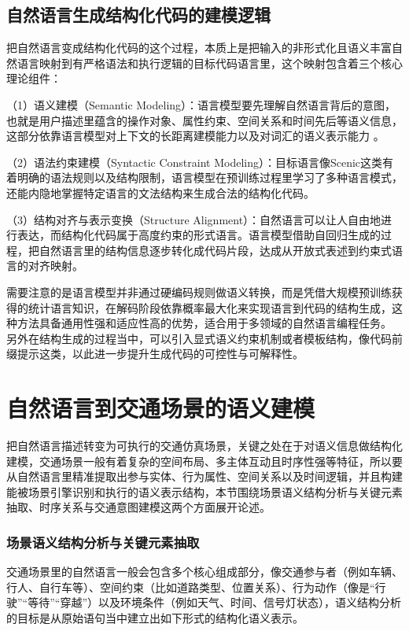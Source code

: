 \subsection{自然语言生成结构化代码的建模逻辑}

把自然语言变成结构化代码的这个过程，本质上是把输入的非形式化且语义丰富自然语言映射到有严格语法和执行逻辑的目标代码语言里，这个映射包含着三个核心理论组件：


	 （1）语义建模（Semantic Modeling）：语言模型要先理解自然语言背后的意图，也就是用户描述里蕴含的操作对象、属性约束、空间关系和时间先后等语义信息，这部分依靠语言模型对上下文的长距离建模能力以及对词汇的语义表示能力 。
	
	 （2）语法约束建模（Syntactic Constraint Modeling）：目标语言像Scenic这类有着明确的语法规则以及结构限制，语言模型在预训练过程里学习了多种语言模式，还能内隐地掌握特定语言的文法结构来生成合法的结构化代码。
	
	 （3）结构对齐与表示变换（Structure Alignment）：自然语言可以让人自由地进行表达，而结构化代码属于高度约束的形式语言。语言模型借助自回归生成的过程，把自然语言里的结构信息逐步转化成代码片段，达成从开放式表述到约束式语言的对齐映射。


需要注意的是语言模型并非通过硬编码规则做语义转换，而是凭借大规模预训练获得的统计语言知识，在解码阶段依靠概率最大化来实现语言到代码的结构生成，这种方法具备通用性强和适应性高的优势，适合用于多领域的自然语言编程任务。
另外在结构生成的过程当中，可以引入显式语义约束机制或者模板结构，像代码前缀提示这类，以此进一步提升生成代码的可控性与可解释性。
\section{自然语言到交通场景的语义建模}

把自然语言描述转变为可执行的交通仿真场景，关键之处在于对语义信息做结构化建模，交通场景一般有着复杂的空间布局、多主体互动且时序性强等特征，所以要从自然语言里精准提取出参与实体、行为属性、空间关系以及时间逻辑，并且构建能被场景引擎识别和执行的语义表示结构，本节围绕场景语义结构分析与关键元素抽取、时序关系与交通意图建模这两个方面展开论述。

\subsubsection{场景语义结构分析与关键元素抽取}

交通场景里的自然语言一般会包含多个核心组成部分，像交通参与者（例如车辆、行人、自行车等）、空间约束（比如道路类型、位置关系）、行为动作（像是“行驶”“等待”“穿越”）以及环境条件（例如天气、时间、信号灯状态），语义结构分析的目标是从原始语句当中建立出如下形式的结构化语义表示。

